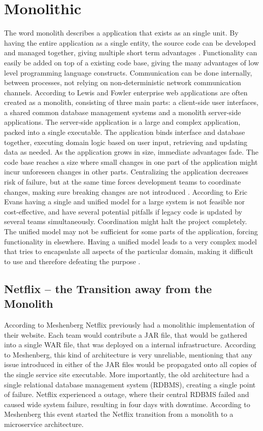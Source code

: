 \section{Monolithic}
The word monolith describes a application that exists as an single unit. By having the entire application as a single entity, the source code can be developed and managed together, giving multiple short term advantages \cite[p.~68]{long2017cloud}. Functionality can easily be added on top of a existing code base, giving the many advantages of low level programming language constructs. Communication can be done internally, between processes, not relying on non-deterministic network communication channels. 
According to Lewis and Fowler\cite{fowler2014microservices} enterprise web applications are often created as a monolith, consisting of three main parts: a client-side user interfaces, a shared common database management systems and a monolith server-side applications. The server-side application is a large and complex application, packed into a single executable. The application binds interface and database together, executing domain logic based on user input, retrieving and updating data as needed.
As the application grows in size, immediate advantages fade. The code base reaches a size where small changes in one part of the application might incur unforeseen changes in other parts. Centralizing the application decreases risk of failure, but at the same time forces development teams to coordinate changes, making sure breaking changes are not introduced \cite[p.~68]{long2017cloud}. 
According to Eric Evans having a single and unified model for a large system is not feasible nor cost-effective, and have several potential pitfalls if legacy code is updated by several teams simultaneously. Coordination might halt the project completely. The unified model may not be sufficient for some parts of the application, forcing functionality in elsewhere. Having a unified model leads to a very complex model that tries to encapsulate all aspects of the particular domain, making it difficult to use and therefore defeating the purpose \cite[p.~331]{evans2004domain}.

\subsection{Netflix -- the Transition away from the Monolith}
According to Meshenberg \cite{meshenberg2016microservices} Netflix previously had a monolithic implementation of their website. Each team would contribute a JAR file, that would be gathered into a single WAR file, that was deployed on a internal infrastructure. According to Meshenberg, this kind of architecture is very unreliable, mentioning that any issue introduced in either of the JAR files would be propagated onto all copies of the single service site executable. More importantly, the old architecture had a single relational database management system (RDBMS), creating a single point of failure\cite{meshenberg2016microservices}. Netflix experienced a outage, where their central RDBMS failed and caused wide system failure, resulting in four days with downtime. According to Meshenberg this event started the Netflix transition from a monolith to a microservice architecture.


